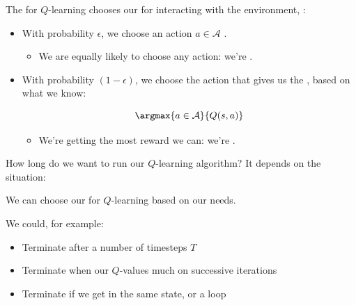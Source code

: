         \begin{definition}
            The  for $Q$-learning chooses our  for interacting with the environment, :

            \begin{itemize}
                \item With probability $\epsilon$, we choose an action $a \in \mathcal{A}$ .
                    \begin{itemize}
                        \item We are equally likely to choose any action: we're .
                    \end{itemize}

                \item With probability $(1-\epsilon)$, we choose the action that gives us the , based on what we know:

                    \begin{equation*}
                        \argmax{a \in \mathcal{A}}{ Q(s,a) }
                    \end{equation*}
                    
                    \begin{itemize}
                        \item We're getting the most reward we can: we're .
                    \end{itemize}
            \end{itemize}
        \end{definition}

        How long do we want to run our $Q$-learning algorithm? It depends on the situation:\\

        \begin{concept}
            We can choose our  for $Q$-learning based on our needs. 

            We could, for example:

            \begin{itemize}
                \item Terminate after a  number of timesteps $T$
                \item Terminate when our $Q$-values  much on successive iterations
                \item Terminate if we get  in the same state, or a loop
            \end{itemize}
        \end{concept}


